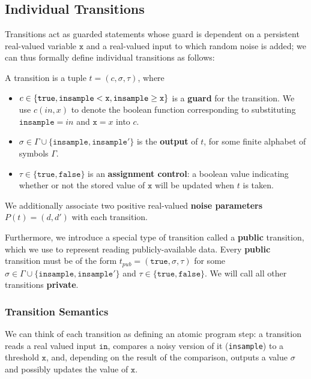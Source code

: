 
\subsection{Individual Transitions}

Transitions act as guarded statements whose guard is dependent on a persistent real-valued variable $\texttt{x}$ and a real-valued input to which random noise is added; we can thus formally define individual transitions as follows:

\begin{defn}[Transitions]\label{svTransDef}
    A transition is a tuple $t = (c, \sigma, \tau)$, where \begin{itemize}
        \item $c\in \{\texttt{true}, \lguard[\texttt{x}], \gguard[\texttt{x}]\}$ is a \textbf{guard} for the transition. We use $c(in, x)$ to denote the boolean function corresponding to substituting $\texttt{insample} = in$ and $\texttt{x} =x $ into $c$.
        \item $\sigma \in \Gamma\cup\{\texttt{insample}, \texttt{insample}'\}$ is the \textbf{output} of $t$, for some finite alphabet of symbols $\Gamma$.
        \item $\tau\in\{\texttt{true}, \texttt{false}\}$ is an \textbf{assignment control}: a boolean value indicating whether or not the stored value of $\texttt{x}$ will be updated when $t$ is taken.
    \end{itemize}
\end{defn}

We additionally associate two positive real-valued \textbf{noise parameters} $P(t) = (d, d')$ with each transition. 

Furthermore, we introduce a special type of transition called a \textbf{public} transition, which we use to represent reading publicly-available data. Every \textbf{public} transition must be of the form $t_{pub}= (\texttt{true}, \sigma, \tau)$ for some $\sigma \in \Gamma\cup\{\texttt{insample}, \texttt{insample}'\}$ and $\tau \in \{\texttt{true}, \texttt{false}\}$. We will call all other transitions \textbf{private}. 

\subsubsection{Transition Semantics}

We can think of each transition as defining an atomic program step: a transition reads a real valued input $\texttt{in}$, compares a noisy version of it (\texttt{insample}) to a threshold $\texttt{x}$, and, depending on the result of the comparison, outputs a value $\sigma$ and possibly updates the value of $\texttt{x}$.

